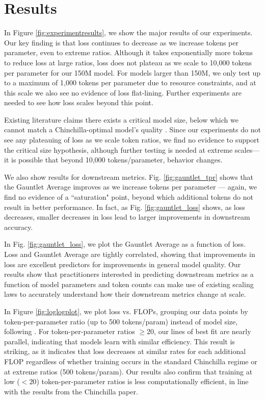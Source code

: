 \documentclass{article}
\theoremstyle{plain}
\theoremstyle{definition}
\theoremstyle{remark}
\begin{document}
\section{Results}
\label{sec:results}
In Figure \ref{fig:experimentresults}, we show the major results of our experiments. Our key finding is that loss continues to decrease as we increase tokens per parameter, even to extreme ratios. Although it takes exponentially more tokens to reduce loss at large ratios, loss does not plateau as we scale to 10,000 tokens per parameter for our 150M model. For models larger than 150M, we only test up to a maximum of 1,000 tokens per parameter due to resource constraints, and at this scale we also see no evidence of loss flat-lining. Further experiments are needed to see how loss scales beyond this point. 

Existing literature claims there exists a critical model size, below which we cannot match a Chinchilla-optimal model's quality \citep{blogpost}. 
Since our experiments do not see any plateauing of loss as we scale token ratios, we find no evidence to support the critical size hypothesis, although further testing is needed at extreme scales---it is possible that beyond 10,000 tokens/parameter, behavior changes.

We also show results for downstream metrics. Fig. \ref{fig:gauntlet_tpr} shows that the Gauntlet Average improves as we increase tokens per parameter --- again, we find no evidence of a ``saturation" point, beyond which additional tokens do not result in better performance. In fact, as Fig. \ref{fig:gauntlet_loss} shows, as loss decreases, smaller decreases in loss lead to larger improvements in downstream accuracy.

In Fig. \ref{fig:gauntlet_loss}, we plot the Gauntlet Average as a function of loss. Loss and Gauntlet Average are tightly correlated, showing that improvements in loss are excellent predictors for improvements in general model quality. Our results show that practitioners interested in predicting downstream metrics as a function of model parameters and token counts can make use of existing scaling laws to accurately understand how their downstream metrics change at scale.  

In Figure \ref{fig:loglogplot}, we plot loss vs. FLOPs, grouping our data points by token-per-parameter ratio (up to 500 tokens/param) instead of model size, following \citet{gadre2024language}. For token-per-parameter ratios $\geq 20$, our lines of best fit are nearly parallel, indicating that models learn with similar efficiency. This result is striking, as it indicates that loss decreases at similar rates for each additional FLOP regardless of whether training occurs in the standard Chinchilla regime or at extreme ratios (500 tokens/param). Our results also confirm that training at low ($<20$) token-per-parameter ratios is less computationally efficient, in line with the results from the Chinchilla paper.
\end{document}
